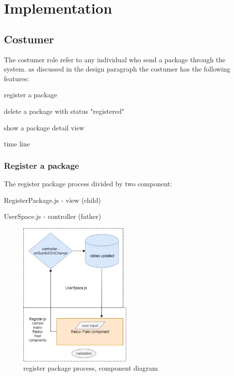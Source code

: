 \chapter{Implementation}
\label{cha:implementation}

\section{Costumer}
The costumer role refer to any individual who send a package through the system.
as discussed in the design paragraph the costumer has the following features:

\begin{description}[font=$\bullet$~\normalfont\scshape\color{red!50!black}]
\item register a package
\item delete a package with status "registered"
\item show a package detail view 
\item time line
\end{description}

\subsection{Register a package}
The register package process divided by two component:
\begin{description}[font=$\bullet$~\normalfont\scshape\color{red!50!black}]
\item RegisterPackage.js - view (child)
\item UserSpace.js - controller (father)
\end{description}


\begin{figure}[!ht]
	\centering
	\includegraphics[width=0.5\textwidth]{images/register.jpg}
	\caption{register package process, component diagram}
	\label{fig:}
\end{figure}


